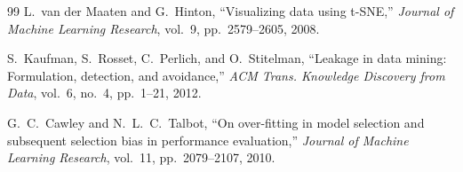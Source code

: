 \documentclass[conference]{IEEEtran}
\begin{document}
\begin{thebibliography}{99}
L.~van der Maaten and G.~Hinton, ``Visualizing data using t-SNE,'' \emph{Journal of Machine Learning Research}, vol.~9,
pp.~2579--2605, 2008.

S.~Kaufman, S.~Rosset, C.~Perlich, and O.~Stitelman, ``Leakage in data mining: Formulation, detection, and avoidance,''
\emph{ACM Trans. Knowledge Discovery from Data}, vol.~6, no.~4, pp.~1--21, 2012.

G.~C.~Cawley and N.~L.~C.~Talbot, ``On over-fitting in model selection and subsequent selection bias in performance
evaluation,'' \emph{Journal of Machine Learning Research}, vol.~11, pp.~2079--2107, 2010.

\end{thebibliography}
\end{document}

